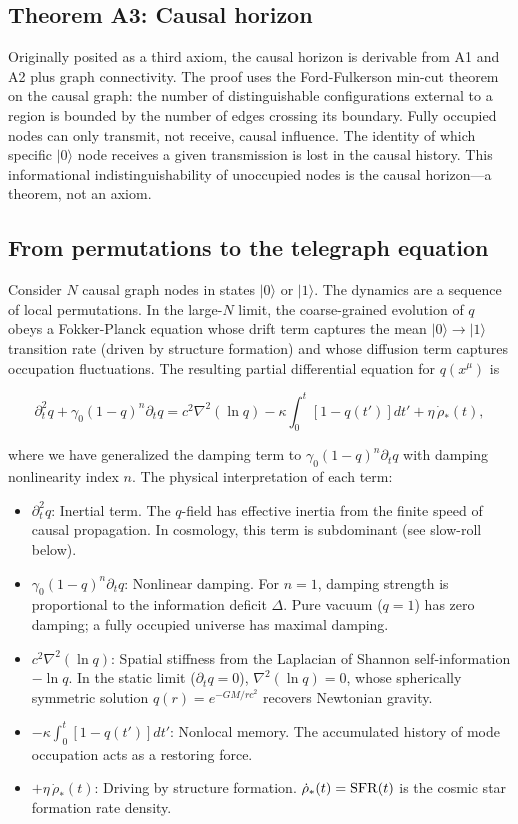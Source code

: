\documentclass[12pt,a4paper]{article}
\begin{document}
\subsection{Theorem A3: Causal horizon}

Originally posited as a third axiom, the causal horizon is derivable from A1 and A2 plus graph connectivity. The proof uses the Ford-Fulkerson min-cut theorem on the causal graph: the number of distinguishable configurations external to a region is bounded by the number of edges crossing its boundary. Fully occupied nodes can only transmit, not receive, causal influence. The identity of which specific $|0\rangle$ node receives a given transmission is lost in the causal history. This informational indistinguishability of unoccupied nodes is the causal horizon---a theorem, not an axiom.

\subsection{From permutations to the telegraph equation}

Consider $N$ causal graph nodes in states $|0\rangle$ or $|1\rangle$. The dynamics are a sequence of local permutations. In the large-$N$ limit, the coarse-grained evolution of $q$ obeys a Fokker-Planck equation whose drift term captures the mean $|0\rangle\to|1\rangle$ transition rate (driven by structure formation) and whose diffusion term captures occupation fluctuations. The resulting partial differential equation for $q(x^\mu)$ is

\begin{equation}\label{sm:telegraph}
\partial_t^2 q + \gamma_0(1-q)^n\partial_t q = c^2\nabla^2(\ln q) - \kappa\int_0^t[1-q(t')]dt' + \eta\,\dot{\rho}_*(t),
\end{equation}

where we have generalized the damping term to $\gamma_0(1-q)^n\partial_t q$ with damping nonlinearity index $n$. The physical interpretation of each term:

\begin{itemize}
\item $\partial_t^2 q$: Inertial term. The $q$-field has effective inertia from the finite speed of causal propagation. In cosmology, this term is subdominant (see slow-roll below).
\item $\gamma_0(1-q)^n\partial_t q$: Nonlinear damping. For $n=1$, damping strength is proportional to the information deficit $\Delta$. Pure vacuum ($q=1$) has zero damping; a fully occupied universe has maximal damping.
\item $c^2\nabla^2(\ln q)$: Spatial stiffness from the Laplacian of Shannon self-information $-\ln q$. In the static limit ($\partial_t q=0$), $\nabla^2(\ln q)=0$, whose spherically symmetric solution $q(r)=e^{-GM/rc^2}$ recovers Newtonian gravity.
\item $-\kappa\int_0^t[1-q(t')]dt'$: Nonlocal memory. The accumulated history of mode occupation acts as a restoring force.
\item $+\eta\,\dot{\rho}_*(t)$: Driving by structure formation. $\dot{\rho}_*(t)={\rm SFR}(t)$ is the cosmic star formation rate density.
\end{itemize}
\end{document}
